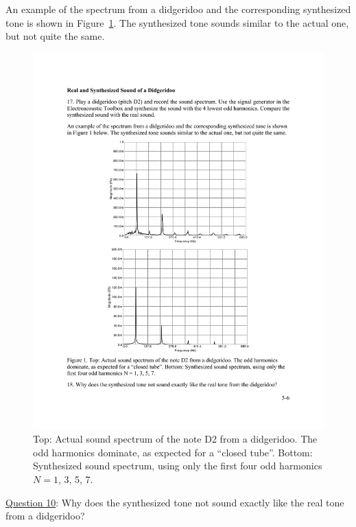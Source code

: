 \documentclass[11pt]{NSF}
\begin{document}
An example of the spectrum from a didgeridoo and the 
corresponding synthesized tone is shown in Figure~\ref{f:1}. 
The synthesized tone sounds similar to the actual one, but not quite the same.
%
\begin{figure}[hbtp]
\begin{center}
\includegraphics[width=.7\textwidth]{fig5_1}
\caption{Top: Actual sound spectrum of the note D2 from a didgeridoo. 
The odd harmonics dominate, as expected for a ``closed tube”. 
Bottom: Synthesized sound spectrum, using only the first four odd harmonics 
$N = 1$, 3, 5, 7.}
\label{f:1} 
\end{center} 
\end{figure}
%

\underline{Question 10}: Why does the synthesized tone not sound
exactly like the real tone from a didgeridoo?
\end{document}
